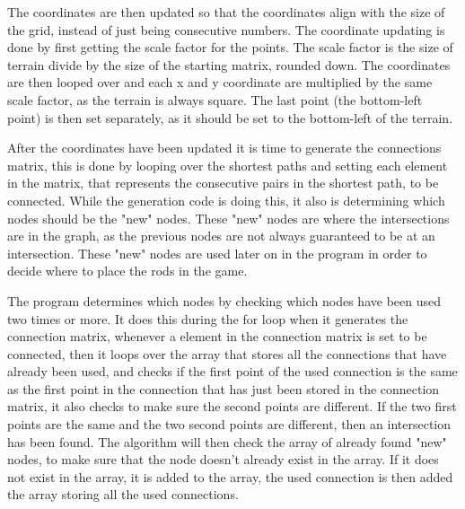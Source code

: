 	The coordinates are then updated so that the coordinates align with the size of the grid, instead of just being consecutive numbers. The coordinate updating is done by first getting the scale factor for the points. The scale factor is the size of terrain divide by the size of the starting matrix, rounded down. The coordinates are then looped over and each x and y coordinate are multiplied by the same scale factor, as the terrain is always square. The last point (the bottom-left point) is then set separately, as it should be set to the bottom-left of the terrain. 
	\newline
	\par
	
	After the coordinates have been updated it is time to generate the connections matrix, this is done by looping over the shortest paths and setting each element in the matrix, that represents the consecutive pairs in the shortest path, to be connected. While the generation code is doing this, it also is determining which nodes should be the "new" nodes. These "new" nodes are where the intersections are in the graph, as the previous nodes are not always guaranteed to be at an intersection. These "new" nodes are used later on in the program in order to decide where to place the rods in the game.
	\newline
	\par
	The program determines which nodes by checking which nodes have been used two times or more. It does this during the for loop when it generates the connection matrix, whenever a element in the connection matrix is set to be connected, then it loops over the array that stores all the connections that have already been used, and checks if the first point of the used connection is the same as the first point in the connection that has just been stored in the connection matrix, it also checks to make sure the second points are different. If the two first points are the same and the two second points are different, then an intersection has been found. The algorithm will then check the array of already found "new" nodes, to make sure that the node doesn't already exist in the array. If it does not exist in the array, it is added to the array, the used connection is then added the array storing all the used connections.
	\newline
	\par
	

